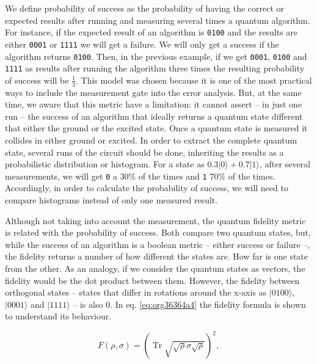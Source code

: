 We define probability of success as the probability of having the correct or expected results after running and measuring several times a quantum algorithm.
For instance, if the expected result of an algorithm is \texttt{0100} and the results are either \texttt{0001} or \texttt{1111} we will get a failure.
We will only get a success if the algorithm returns \texttt{0100}.
Then, in the previous example, if we get \texttt{0001}, \texttt{0100} and \texttt{1111} as results after running the algorithm three times the resulting probability of success will be \(\frac{1}{3}\).
This model was chosen because it is one of the most practical ways to include the measurement gate into the error analysis.
But, at the same time, we aware that this metric have a limitation: it cannot assert -- in just one run -- the success of an algorithm that ideally returns a quantum state different that either the ground or the excited state.
Once a quantum state is measured it collides in either ground or excited.
In order to extract the complete quantum state, several runs of the circuit should be done, inheriting the results as a probabilistic distribution or histogram.
For a state as \(0.3 | 0 \rangle + 0.7 | 1 \rangle\), after several measurements, we will get \texttt{0} a 30\% of the times and \texttt{1} 70\% of the times.
Accordingly, in order to calculate the probability of success, we will need to compare histograms instead of only one measured result.

Although not taking into account the measurement, the quantum fidelity metric is related with the probability of success.
Both compare two quantum states, but, while the success of an algorithm is a boolean metric -- either success or failure --, the fidelity returns a number of how different the states are.
How far is one state from the other.
As an analogy, if we consider the quantum states as vectors, the fidelity would be the dot product between them.
However, the fidelity between orthogonal states -- states that differ in rotations around the x-axis as \(| 0100 \rangle\), \(| 0001 \rangle\) and \(| 1111 \rangle\) -- is also 0.
In eq. \ref{eq:org36364a4} the fidelity formula is shown to understand its behaviour.

\begin{equation}
\label{eq:org36364a4}
{\displaystyle F(\rho ,\sigma )=\left(\operatorname {Tr} {\sqrt {{\sqrt {\rho }}\sigma {\sqrt {\rho }}}}\right)^{2},}
\end{equation}

